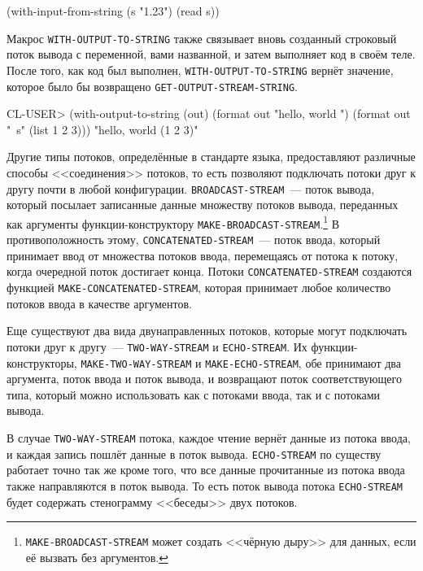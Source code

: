\begin{myverb}
(with-input-from-string (s "1.23") 
  (read s))
\end{myverb}

Макрос \lstinline{WITH-OUTPUT-TO-STRING} также связывает вновь созданный строковый поток вывода
с переменной, вами названной, и затем выполняет код в своём теле. После того, как код был
выполнен, \lstinline{WITH-OUTPUT-TO-STRING} вернёт значение, которое было бы возвращено
\lstinline{GET-OUTPUT-STREAM-STRING}.
 
\begin{myverb}
CL-USER> (with-output-to-string (out) 
            (format out "hello, world ") 
            (format out "~s" (list 1 2 3))) 
"hello, world (1 2 3)" 
\end{myverb}

Другие типы потоков, определённые в стандарте языка, предоставляют различные способы
<<соединения>> потоков, то есть позволяют подключать потоки друг к другу почти в любой
конфигурации. \lstinline{BROADCAST-STREAM}~--- поток вывода, который посылает записанные данные
множеству потоков вывода, переданных как аргументы функции-конструктору
\lstinline{MAKE-BROADCAST-STREAM}.\footnote{\lstinline{MAKE-BROADCAST-STREAM} может создать <<чёрную
  дыру>> для данных, если её вызвать без аргументов.} В противоположность этому,
\lstinline{CONCATENATED-STREAM}~--- поток ввода, который принимает ввод от множества потоков
ввода, перемещаясь от потока к потоку, когда очередной поток достигает конца. Потоки
\lstinline{CONCATENATED-STREAM} создаются функцией \lstinline{MAKE-CONCATENATED-STREAM}, которая
принимает любое количество потоков ввода в качестве аргументов.

Еще существуют два вида двунаправленных потоков, которые могут подключать потоки друг к
другу~--- \lstinline{TWO-WAY-STREAM} и \lstinline{ECHO-STREAM}. Их функции-конструкторы,
\lstinline{MAKE-TWO-WAY-STREAM} и \lstinline{MAKE-ECHO-STREAM}, обе принимают два аргумента, поток
ввода и поток вывода, и возвращают поток соответствующего типа, который можно использовать
как с потоками ввода, так и с потоками вывода.

В случае \lstinline{TWO-WAY-STREAM} потока, каждое чтение вернёт данные из потока ввода, и
каждая запись пошлёт данные в поток вывода. \lstinline{ECHO-STREAM} по существу работает точно
так же кроме того, что все данные прочитанные из потока ввода также направляются в поток
вывода. То есть поток вывода потока \lstinline{ECHO-STREAM} будет содержать стенограмму
<<беседы>> двух потоков.

